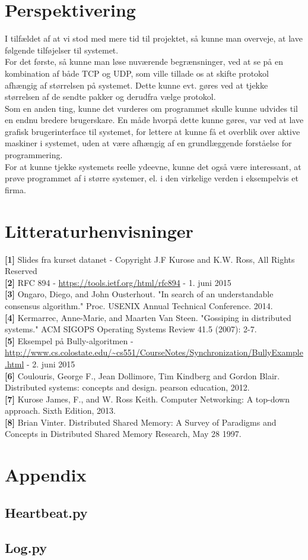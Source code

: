 \documentclass[a4paper,12pt]{article}
\begin{document}
\section{Perspektivering}
I tilfældet af at vi stod med mere tid til projektet, så kunne man overveje, at lave følgende tilføjelser til systemet.
\\
For det første, så kunne man løse nuværende begrænsninger, ved at se på en kombination af både TCP og UDP, som ville tillade os at skifte protokol afhængig af størrelsen på systemet. Dette kunne evt. gøres ved at tjekke størrelsen af de sendte pakker og derudfra vælge protokol.
\\
Som en anden ting, kunne det vurderes om programmet skulle kunne udvides til en endnu bredere brugerskare. En måde hvorpå dette kunne gøres, var ved at lave grafisk brugerinterface til systemet, for lettere at kunne få et overblik over aktive maskiner i systemet, uden at være afhængig af en grundlæggende forståelse for programmering.
\\
For at kunne tjekke systemets reelle ydeevne, kunne det også være interessant, at prøve programmet af i større systemer, el. i den virkelige verden i eksempelvis et firma.
\newpage

\section{Litteraturhenvisninger}
\textbf{[1]} Slides fra kurset datanet - Copyright J.F Kurose and K.W. Ross, All Rights Reserved
\\[5px]
\textbf{[2]} RFC 894 - \url{https://tools.ietf.org/html/rfc894} - 1. juni 2015
\\[5px]
\textbf{[3]} Ongaro, Diego, and John Ousterhout. "In search of an understandable consensus algorithm." Proc. USENIX Annual Technical Conference. 2014.
\\[5px]
\textbf{[4]} Kermarrec, Anne-Marie, and Maarten Van Steen. "Gossiping in distributed systems." ACM SIGOPS Operating Systems Review 41.5 (2007): 2-7.
\\[5px]
\textbf{[5]} Eksempel på Bully-algoritmen - \url{http://www.cs.colostate.edu/~cs551/CourseNotes/Synchronization/BullyExample.html} - 2. juni 2015
\\[5px]
\textbf{[6]} Coulouris, George F., Jean Dollimore, Tim Kindberg and Gordon Blair. Distributed systems: concepts and design. pearson education, 2012.
\\[5px]
\textbf{[7]} Kurose James, F., and W. Ross Keith. Computer Networking: A top-down approach. Sixth Edition, 2013.
\\[5px]
\textbf{[8]} Brian Vinter. Distributed Shared Memory: A Survey of Paradigms and Concepts in Distributed Shared Memory Research, May 28 1997.
\newpage


\section{Appendix}
\subsection{Heartbeat.py}


\subsection{Log.py}

\end{document}
